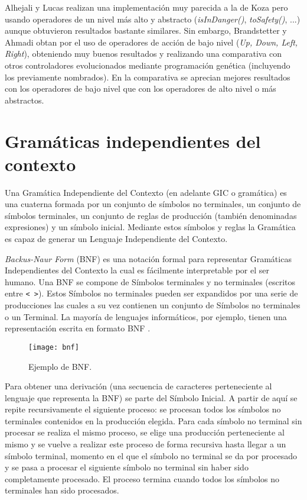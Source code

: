 Alhejali y Lucas \cite{alhejali2010evolving} realizan una implementación muy parecida a la de Koza pero usando operadores de un nivel más alto y abstracto (\textit{isInDanger()}, \textit{toSafety()}, ...) aunque obtuvieron resultados bastante similares. Sin embargo, Brandstetter y Ahmadi \cite{brandstetter2012reactive} obtan por el uso de operadores de acción de bajo nivel (\textit{Up, Down, Left, Right}), obteniendo muy buenos resultados y realizando una comparativa con otros controladores evolucionados mediante programación genética (incluyendo los previamente nombrados). En la comparativa se aprecian mejores resultados con los operadores de bajo nivel que con los operadores de alto nivel o más abstractos.

\section{Gramáticas independientes del contexto}
Una Gramática Independiente del Contexto (en adelante GIC o gramática) es una cuaterna formada por un conjunto de símbolos no terminales, un conjunto de símbolos terminales, un conjunto de reglas de producción (también denominadas expresiones) y un símbolo inicial. Mediante estos símbolos y reglas la Gramática es capaz de generar un Lenguaje Independiente del Contexto\cite{hopcroft_motwani_ullman_2007}\cite{HolgerApuntes}.

\textit{Backus-Naur Form} (BNF) es una notación formal para representar Gramáticas Independientes del Contexto la cual es fácilmente interpretable por el ser humano. Una BNF se compone de Símbolos terminales y no terminales (escritos entre \texttt{< >}). Estos Símbolos no terminales pueden ser expandidos por una serie de producciones las cuales a su vez contienen un conjunto de Símbolos no terminales o un Terminal. La mayoría de lenguajes informáticos, por ejemplo, tienen una representación escrita en formato BNF \cite{garshol2003bnf}.

\begin{figure}[H]
\centering
\texttt{[image: bnf]}
\caption{Ejemplo de BNF.}
\end{figure}

Para obtener una derivación (una secuencia de caracteres perteneciente al lenguaje que representa la BNF) se parte del Símbolo Inicial. A partir de aquí se repite recursivamente el siguiente proceso: se procesan todos los símbolos no terminales contenidos en la producción elegida. Para cada símbolo no terminal sin procesar se realiza el mismo proceso, se elige una producción perteneciente al mismo y se vuelve a realizar este proceso de forma recursiva hasta llegar a un símbolo terminal, momento en el que el símbolo no terminal se da por procesado y se pasa a procesar el siguiente símbolo no terminal sin haber sido completamente procesado. El proceso termina cuando todos los símbolos no terminales han sido procesados.

